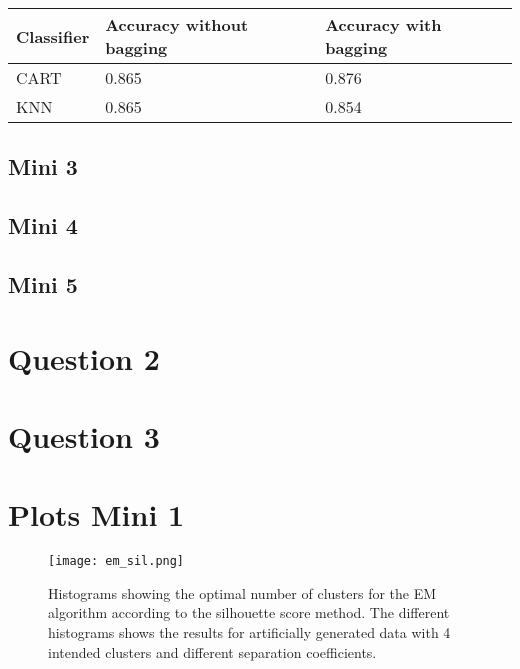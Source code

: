 \documentclass[11pt,twoside,swedish]{article}
\begin{document}
\begin{table}
\begin{center}
\begin{tabular}{ l | l l}
 Classifier & Accuracy without bagging & Accuracy with bagging \\ 
 \hline
 CART & 0.865 & 0.876 \\
 KNN & 0.865 & 0.854\\
\end{tabular}
\end{center}
\label{titanic bagging}
\end{table}



\subsection{Mini 3}\label{Mini 3}
\subsection{Mini 4}\label{Mini 4}
\subsection{Mini 5}\label{Mini 5}

\section{Question 2}\label{Question 2}

\section{Question 3}\label{Question 3}

\newpage
\appendix

\section{Plots Mini 1}\label{Plots Mini 1}

\graphicspath{{/home/mikael/Repos/Courses/msa220/Mini/Mini/Mini_1/new_plots/}}
\begin{figure}
\begin{center}
\texttt{[image: em\_sil.png]}
\caption{Histograms showing the optimal number of clusters for the EM
  algorithm according to the silhouette score method. The different
  histograms shows the results for artificially generated data with 4
  intended clusters and different separation coefficients.}
\label{em_sil_hists}
\end{center}
\end{figure}
\end{document}
